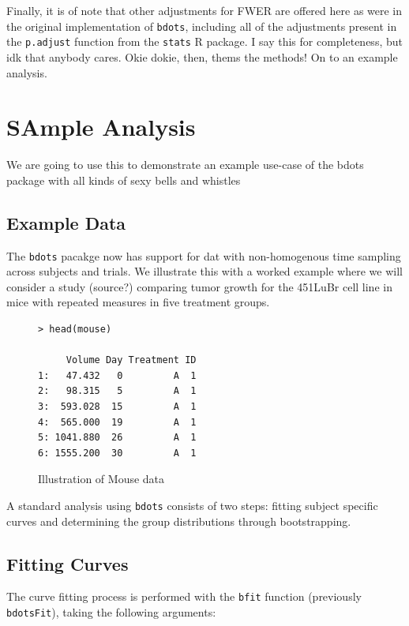 \documentclass{article}
\newcommand{\xt}{\texttt}%
\begin{document}
Finally, it is of note that other adjustments for FWER are offered here as were in the original implementation of \xt{bdots}, including all of the adjustments present in the \xt{p.adjust} function from the \xt{stats} R package. I say this for completeness, but idk that anybody cares. Okie dokie, then, thems the methods! On to an example analysis.


\section{SAmple Analysis}

We are going to use this to demonstrate an example use-case of the bdots package with all kinds of sexy bells and whistles

\subsection{Example Data}
The \xt{bdots} pacakge now has support for dat with non-homogenous time sampling across subjects and trials. We illustrate this with a worked example where we will consider a study (source?) comparing tumor growth for the 451LuBr cell line in mice with repeated measures in five treatment groups.

\begin{singlespace}
\begin{figure}
\centering
\begin{BVerbatim}
> head(mouse)

     Volume Day Treatment ID
1:   47.432   0         A  1
2:   98.315   5         A  1
3:  593.028  15         A  1
4:  565.000  19         A  1
5: 1041.880  26         A  1
6: 1555.200  30         A  1
\end{BVerbatim}
\caption{Illustration of Mouse data}
\label{fig:mouse_head}
\end{figure}
\end{singlespace}

A standard analysis using \xt{bdots} consists of two steps: fitting subject specific curves and determining the group distributions through bootstrapping.

\subsection{Fitting Curves}

The curve fitting process is performed with the \texttt{bfit} function (previously \texttt{bdotsFit}), taking the following arguments:
\end{document}
